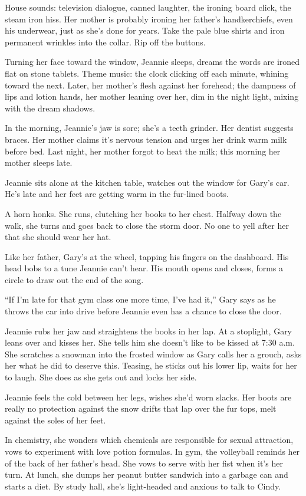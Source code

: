 \documentclass[
]{article}
\begin{document}
House sounds: television dialogue, canned laughter, the ironing board
click, the steam iron hiss. Her mother is probably ironing her father's
handkerchiefs, even his underwear, just as she's done for years. Take
the pale blue shirts and iron permanent wrinkles into the collar. Rip
off the buttons.

Turning her face toward the window, Jeannie sleeps, dreams the words are
ironed flat on stone tablets. Theme music: the clock clicking off each
minute, whining toward the next. Later, her mother's flesh against her
forehead; the dampness of lips and lotion hands, her mother leaning over
her, dim in the night light, mixing with the dream shadows.

In the morning, Jeannie's jaw is sore; she's a teeth grinder. Her
dentist suggests braces. Her mother claims it's nervous tension and
urges her drink warm milk before bed. Last night, her mother forgot to
heat the milk; this morning her mother sleeps late.

Jeannie sits alone at the kitchen table, watches out the window for
Gary's car. He's late and her feet are getting warm in the fur-lined
boots.

A horn honks. She runs, clutching her books to her chest. Halfway down
the walk, she turns and goes back to close the storm door. No one to
yell after her that she should wear her hat.

Like her father, Gary's at the wheel, tapping his fingers on the
dashboard. His head bobs to a tune Jeannie can't hear. His mouth opens
and closes, forms a circle to draw out the end of the song.

``If I'm late for that gym class one more time, I've had it,'' Gary says
as he throws the car into drive before Jeannie even has a chance to
close the door.

Jeannie rubs her jaw and straightens the books in her lap. At a
stoplight, Gary leans over and kisses her. She tells him she doesn't
like to be kissed at 7:30 a.m. She scratches a snowman into the frosted
window as Gary calls her a grouch, asks her what he did to deserve this.
Teasing, he sticks out his lower lip, waits for her to laugh. She does
as she gets out and locks her side.

Jeannie feels the cold between her legs, wishes she'd worn slacks. Her
boots are really no pro­tection against the snow drifts that lap over
the fur tops, melt against the soles of her feet.

In chemistry, she wonders which chemicals are responsible for sexual
attraction, vows to exper­iment with love potion formulas. In gym, the
volleyball reminds her of the back of her father's head. She vows to
serve with her fist when it's her turn. At lunch, she dumps her peanut
butter sandwich into a garbage can and starts a diet. By study hall,
she's light-headed and anxious to talk to Cindy.
\end{document}
